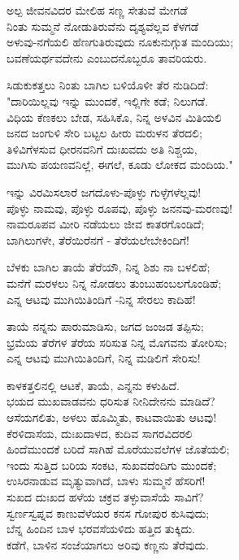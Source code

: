 \begin{myquote}
ಅಲ್ಪ ಜೀವನವಿದರ ಮೇಲಿಹ ಸಣ್ಣ ಸೇತುವೆ ಮೇಗಡೆ\\ನಿಂತು ಸುಮ್ಮನೆ ನೋಡುತಿರುವೆನು ದೃಶ್ಯವೆಲ್ಲವ ಕೆಳಗಡೆ\\ಅಳುವು-ನಗೆಯಲಿ ಹೆಣಗುತಿರುವುದು ನೂಕುನುಗ್ಗುತ ಮಂದಿಯು;\\ಬವಣೆಯರ್ಥವದೇನು ಎಂಬುದನೊಬ್ಬರೂ ತಾವರಿಯರು.
\end{myquote}

\begin{myquote}
ಸಿಡುಕುಕತ್ತಲು ನಿಂತು ಬಾಗಿಲ ಬಳಿಯೊಳೀ ತೆರ ನುಡಿದಿದೆ:\\"ದಾರಿಯಿಲ್ಲವು ಇನ್ನು ಮುಂದಕೆ, ಇಲ್ಲಿಗೇ ಕಡೆ; ನಿಲುಗಡೆ.\\ವಿಧಿಯ ಕೆಣಕಲು ಬೇಡ, ಸಹಿಸಿಕೊ, ನಿನ್ನ ಅಳವಿನ ಮಿತಿಯಲಿ\\ಜನದ ಜಂಗುಳಿ ಸೇರಿ ಬಟ್ಟಲ ಹೀರು ಮರುಳನ ತೆರದಲಿ;\\ತಿಳಿವಿಗೆಳಸುವ ಧೀರನವನಿಗೆ ದುಃಖವದು ಅತಿ ನಿಶ್ಚಯ,\\ಮುಗಿಸು ಪಯಣವನಿಲ್ಲೆ, ಈಗಲೆ, ಕೂಡು ಲೋಕದ ಮಂದಿಯ."
\end{myquote}

\begin{myquote}
ಇನ್ನು ವಿರಮಿಸಲಾರೆ ಜಗದೊಳು-ಪೊಳ್ಳು ಗುಳ್ಳೆಗಳೆಲ್ಲವು!\\ಪೊಳ್ಳು ನಾಮವು, ಪೊಳ್ಳು ರೂಪವು, ಪೊಳ್ಳು ಜನನವು-ಮರಣವು!\\ನಾಮರೂಪವ ಮೀರಿ ನಡೆಯಲು ಜೀವ ಕಾತರಗೊಂಡಿದೆ;\\ಬಾಗಿಲುಗಳೇ, ತೆರೆಯಿರೆನಗೆ - ತೆರೆಯಲೇಬೇಕಿಂದಿಗೆ!
\end{myquote}

\begin{myquote}
ಬೆಳಕು ಬಾಗಿಲ ತಾಯೆ ತೆರೆಯೌ, ನಿನ್ನ ಶಿಶು ನಾ ಬಳಲಿಹೆ;\\ಮನೆಗೆ ಮರಳಲು ನಿನ್ನ ನೋಡಲು ತುಂಬುಹಂಬಲಗೊಂಡಿಹೆ;\\ಎನ್ನ ಆಟವು ಮುಗಿಯಿತಿಂದಿಗೆ -ನಿನ್ನ ಸೇರಲು ಕಾದಿಹೆ!
\end{myquote}

\begin{myquote}
ತಾಯೆ ನನ್ನನು ಪಾರುಮಾಡಿಸು, ಜಗದ ಜಂಜಡ ತಪ್ಪಿಸು;\\ಭ್ರಮೆಯ ತೆರೆಗಳ ತೆರೆಯ ಸರಿಸುತ ನಿನ್ನ ಮೊಗವನು ತೋರಿಸು;\\ಎನ್ನ ಆಟವು ಮುಗಿಯಿತಿಂದಿಗೆ, ನಿನ್ನ ಮಡಿಲಿಗೆ ಸೇರಿಸು!
\end{myquote}

\begin{myquote}
ಕಾಳಕತ್ತಲಿನಲ್ಲಿ ಆಟಕೆ, ತಾಯೆ, ಎನ್ನನು ಕಳುಹಿದೆ.\\ಭಯದ ಮುಖವಾಡವನು ಧರಿಸುತ ನೀನಿದೇನನು ಮಾಡಿದೆ?\\ಆಸೆಯಗಲಿತು, ಅಳಲು ಹೊಮ್ಮಿತು, ಕಾಟವಾಯಿತು ಆಟವು!\\ಕೆರಳಿದಾಸೆಯ, ದುಃಖದಾಳದ, ಕುದಿವ ಸಾಗರವಿದರಲಿ\\ಹಿಂದೆಮುಂದಕೆ ಬರಿದೆ ಸಾಗಿಹೆ ಮೊರೆಯುವಲೆಗಳ ಜೊತೆಯಲಿ;\\ಇಂದು ಸುತ್ತಿದ ಬರಿಯ ಸಂಕಟ, ಸುಖವದೆಂದಿಗು ಮುಂದಕೆ;\\ಉಸಿರನಾಡುವ ಮೃತ್ಯುವಾಗಿದೆ, ಬಾಳು ಸುಮ್ಮನೆ ಹೆಸರಿಗೆ!\\ಸುಖದ ದುಃಖದ ಹಳೆಯ ಚಕ್ರವ ತಳ್ಳುವಾಸೆಯೆ ಸಾವಿಗೆ?\\ಸ್ವರ್ಣಸ್ವಪ್ನವ ಕಾಣುವೆಳೆಯರ ಕನಸ ಗೋಪುರ ಕುಸಿವುದು;\\ಬೆನ್ನ ಹಿಂದಿನ ಬಾಳ ಭರವಸೆಯಳಿದು ಹತ್ತಿದ ತುಕ್ಕಿದು.\\ಕಡೆಗೆ, ಬಾಳಿನ ಸಂಜೆಯಾಗಲು ಅರಿವು ಕಣ್ಣನು ತೆರೆವುದು.
\end{myquote}


